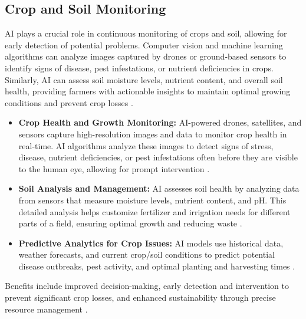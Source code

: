 \subsection{Crop and Soil Monitoring}
AI plays a crucial role in continuous monitoring of crops and soil, allowing for early detection of potential problems. Computer vision and machine learning algorithms can analyze images captured by drones or ground-based sensors to identify signs of disease, pest infestations, or nutrient deficiencies in crops. Similarly, AI can assess soil moisture levels, nutrient content, and overall soil health, providing farmers with actionable insights to maintain optimal growing conditions and prevent crop losses \cite{singh2024artificial}.
\begin{itemize}
    \item \textbf{Crop Health and Growth Monitoring:} AI-powered drones, satellites, and sensors capture high-resolution images and data to monitor crop health in real-time. AI algorithms analyze these images to detect signs of stress, disease, nutrient deficiencies, or pest infestations often before they are visible to the human eye, allowing for prompt intervention \cite{NovusASI_CropMonitoring, Intelliarts_CropMonitoring}.
    \item \textbf{Soil Analysis and Management:} AI assesses soil health by analyzing data from sensors that measure moisture levels, nutrient content, and pH. This detailed analysis helps customize fertilizer and irrigation needs for different parts of a field, ensuring optimal growth and reducing waste \cite{AIMSYS_CropMonitoring}.
    \item \textbf{Predictive Analytics for Crop Issues:} AI models use historical data, weather forecasts, and current crop/soil conditions to predict potential disease outbreaks, pest activity, and optimal planting and harvesting times \cite{VlinkInfo_CropMonitoring, CheckerAI_CropMonitoring}.
\end{itemize}
Benefits include improved decision-making, early detection and intervention to prevent significant crop losses, and enhanced sustainability through precise resource management \cite{Ultralytics_CropMonitoring, Zealousys_CropMonitoring}.

